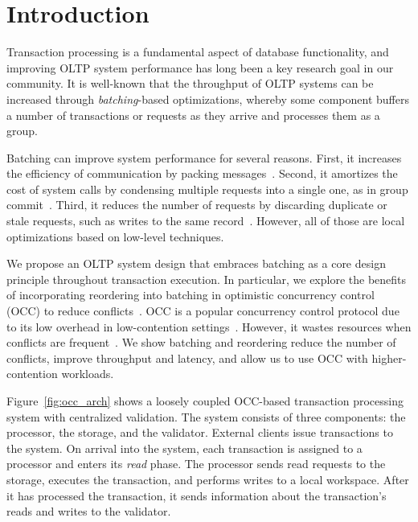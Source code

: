 \section{Introduction}\label{sec:intro}

Transaction processing is a fundamental aspect of database functionality, and improving OLTP system performance has long been a key research goal in our community. It is well-known that the throughput of OLTP systems can be increased through \emph{batching}-based optimizations, whereby some component buffers a number of transactions or requests as they arrive and processes them as a group.

Batching can improve system performance for several reasons. First, it increases the efficiency of communication by packing messages~\cite{ding2015centiman,friedman1997packing}. Second, it amortizes the cost of system calls by condensing multiple requests into a single one, as in group commit~\cite{debrabant2013anti,hagmann1987reimplementing}. Third, it reduces the number of requests by discarding duplicate or stale requests, such as writes to the same record~\cite{faleiro2014lazy}. However, all of those are local optimizations based on low-level techniques.

We propose an OLTP system design that embraces batching as a core design
principle throughout transaction execution.  In particular, we explore the
benefits of incorporating reordering into batching in optimistic concurrency control (OCC) to reduce conflicts~\cite{kung81tods}. OCC is a popular concurrency control protocol due to its low overhead in low-contention
settings~\cite{adya97podc, baker11cidr, bernstein2015optimizing,bernstein11cidr,
bernstein11vldb, corbett12osdi,warp, patterson12vldb,peng10osdi,larson2011high}. However, it
wastes resources when conflicts are frequent~\cite{agrawal1987concurrency}. We
show batching and reordering reduce the number of conflicts, improve
throughput and latency, and allow us to use OCC with higher-contention workloads.


Figure~\ref{fig:occ_arch} shows a loosely coupled OCC-based transaction processing system with centralized validation. The system consists of three components: the processor, the storage, and the validator. External clients issue transactions to the system. On arrival into the system, each transaction is assigned to a processor and enters its \emph{read} phase. The processor sends read requests to the storage, executes the transaction, and performs writes to a local workspace. After it has processed the transaction, it sends information about the transaction's reads and writes to the validator. 

